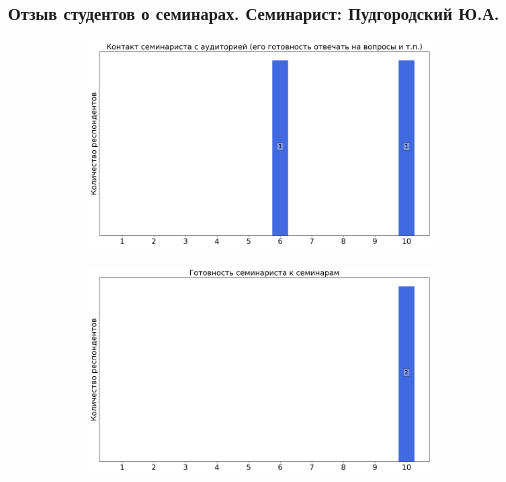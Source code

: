     \subsubsection{Отзыв студентов о семинарах. Семинарист: Пудгородский Ю.А.}
        \begin{figure}[H]
            \centering
            \begin{subfigure}[b]{0.45\textwidth}
                \centering
                \includegraphics[width=\textwidth]{images/2 course/Компьютерные технологии/seminarists-marks-Пудгородский Ю.А.-0.png}
            \end{subfigure}
            \begin{subfigure}[b]{0.45\textwidth}
                \centering
                \includegraphics[width=\textwidth]{images/2 course/Компьютерные технологии/seminarists-marks-Пудгородский Ю.А.-1.png}
            \end{subfigure}
            \begin{subfigure}[b]{0.45\textwidth}
                \centering

\end{subfigure}
\end{figure}

